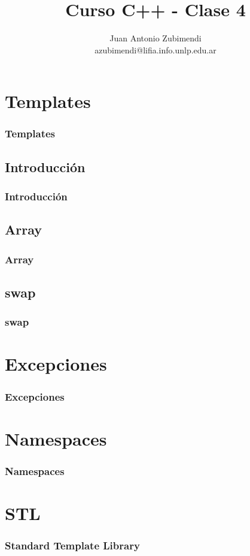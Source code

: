 \documentclass{beamer}
\title{Curso C++ - Clase 4}
\author{Juan Antonio Zubimendi\\azubimendi@lifia.info.unlp.edu.ar}
\institute{LIFIA}
\begin{document}
 
\begin{frame}
\titlepage
\end{frame}

\section{Templates}
\begin{frame}
\frametitle{Templates}

\end{frame}

\subsection{Introducción}
\begin{frame}
\frametitle{Introducción}

\end{frame}

\subsection{Array}
\begin{frame}
\frametitle{Array}

\end{frame}

\subsection{swap}
\begin{frame}
\frametitle{swap}

\end{frame}

\section{Excepciones}
\begin{frame}
\frametitle{Excepciones}

\end{frame}

\section{Namespaces}
\begin{frame}
\frametitle{Namespaces}

\end{frame}

\section{STL}
\begin{frame}
\frametitle{Standard Template Library}

\end{frame}
\end{document}
